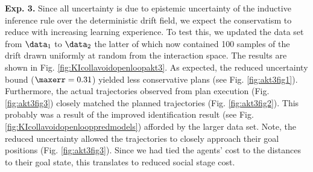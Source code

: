  
\textbf{Exp. 3.}
Since all uncertainty is due to epistemic uncertainty of the inductive inference rule over the deterministic drift field, we expect the conservatism to reduce with increasing learning experience. To test this, we updated the data set from $\data_1$ to $\data_2$ the latter of which now contained 100 samples of the drift drawn uniformly at random from the interaction space. 
The results are shown in Fig. \ref{fig:KIcollavoidopenloopakt3}.
As expected, the reduced uncertainty bound ($\maxerr = 0.31$) yielded less conservative plans (see Fig. \ref{fig:akt3fig1}). Furthermore, the actual trajectories observed from plan execution (Fig. \ref{fig:akt3fig3})  closely matched the planned trajectories (Fig. \ref{fig:akt3fig2}). This probably was a result of the improved identification result (see Fig. \ref{fig:KIcollavoidopenlooppredmodels}) afforded by the larger data set. Note, the reduced uncertainty allowed the trajectories to closely approach their goal positions (Fig. \ref{fig:akt3fig3}). Since we had tied the agents' cost to the distances to their goal state, this translates to reduced social stage cost. 

